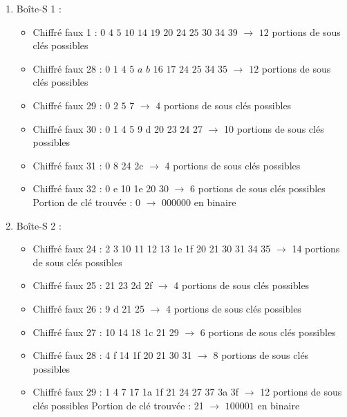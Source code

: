 \documentclass[11pt]{article}
\begin{document}
\begin{enumerate}
	\item Boîte-S 1 : 
	\begin{itemize}
		\item Chiffré faux 1 : $0$ $4$ $5$ $10$ $14$ $19$ $20$ $24$ $25$ $30$ $34$ $39$ $\longrightarrow$ $12$ portions de sous clés possibles
		\item Chiffré faux 28 : $0$ $1$ $4$ $5$ $a$ $b$ $16$ $17$ $24$ $25$ $34$ $35$ $\longrightarrow$ $12$ portions de sous clés possibles
		\item Chiffré faux 29 : $0$ $2$ $5$ $7$ $\longrightarrow$ $4$ portions de sous clés possibles
		\item Chiffré faux 30 : 0 1 4 5 9 d 20 23 24 27 $\longrightarrow$ 10 portions de sous clés possibles
		\item Chiffré faux 31 : 0 8 24 2c $\longrightarrow$ 4 portions de sous clés possibles
		\item Chiffré faux 32 : 0 e 10 1e 20 30 $\longrightarrow$ 6 portions de sous clés possibles \newline
		Portion de clé trouvée : 0 $\longrightarrow$ $000000$ en binaire
	\end{itemize}

	\item Boîte-S 2 : 
\begin{itemize}
	\item Chiffré faux 24 : 2 3 10 11 12 13 1e 1f 20 21 30 31 34 35 $\longrightarrow$ 14 portions de sous clés possibles
	\item Chiffré faux 25 : 21 23 2d 2f $\longrightarrow$ 4 portions de sous clés possibles
	\item Chiffré faux 26 : 9 d 21 25 $\longrightarrow$ 4 portions de sous clés possibles
	\item Chiffré faux 27 : 10 14 18 1c 21 29 $\longrightarrow$ 6 portions de sous clés possibles
	\item Chiffré faux 28 : 4 f 14 1f 20 21 30 31 $\longrightarrow$ 8 portions de sous clés possibles
	\item Chiffré faux 29 : 1 4 7 17 1a 1f 21 24 27 37 3a 3f $\longrightarrow$ 12 portions de sous clés possibles \newline
	Portion de clé trouvée : 21 $\longrightarrow$ $100001$ en binaire
\end{itemize}


\end{enumerate}
\end{document}
